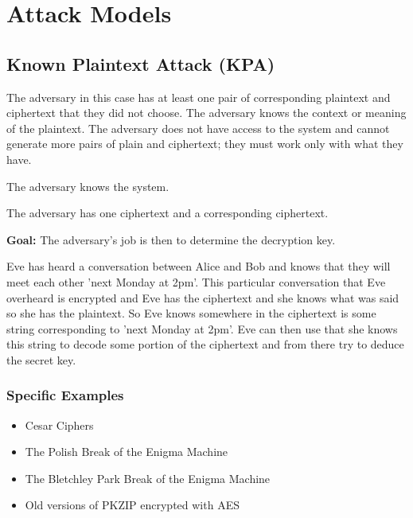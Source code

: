\section{Attack Models}

\subsection{Known Plaintext Attack (KPA)}

The adversary in this case has at least one pair of corresponding plaintext and ciphertext that they did not choose.
The adversary knows the context or meaning of the plaintext.
The adversary does not have access to the system and cannot generate more pairs of plain and ciphertext; they must work only with what they have.


\begin{asu}
The adversary knows the system.
\end{asu}

\begin{asu} The adversary has one ciphertext and a corresponding ciphertext.
\end{asu}

\textbf{Goal:} The adversary’s job is then to determine the decryption key.


\begin{exmp}

Eve has heard a conversation between Alice and Bob and knows that they will meet each other 'next Monday at 2pm'.
This particular conversation that Eve overheard is encrypted and Eve has the ciphertext and she knows what was said so she has the plaintext. 
So Eve knows somewhere in the ciphertext is some string corresponding to 'next Monday at 2pm'. 
Eve can then use that she knows this string to decode some portion of the ciphertext and from there try to deduce the secret key. 
\end{exmp}

\subsubsection*{Specific Examples}


\begin{exmp}
    \begin{itemize}
        \item Cesar Ciphers
        \item The Polish Break of the Enigma Machine
        \item The Bletchley Park Break of the Enigma Machine
        \item Old versions of PKZIP encrypted with AES
    \end{itemize}
\end{exmp}



